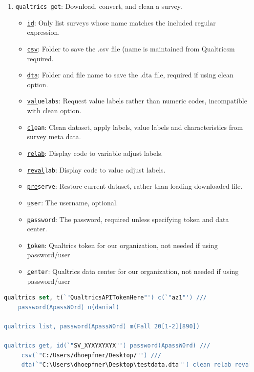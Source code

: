 {\begin{enumerate}
\begin{itemize}
\end{itemize}
\item \texttt{qualtrics get}: Download, convert, and clean a survey.
\begin{itemize}
\item \texttt{\underline{id}}: Only list surveys whose name matches the included regular expression.
\item \texttt{\underline{csv}}: Folder to save the .csv file (name is maintained from Qualtricsm required.
\item \texttt{\underline{dta}}: Folder and file name to save the .dta file, required if using clean option.
\item \texttt{\underline{val}uelabs}: Request value labels rather than numeric codes, incompatible with clean option.
\item \texttt{\underline{cl}ean}: Clean dataset, apply labels, value labels and characteristics from survey meta data.
\item \texttt{\underline{relab}}: Display code to variable adjust labels.
\item \texttt{\underline{reval}lab}: Display code to value adjust labels.
\item \texttt{\underline{pre}serve}: Restore current dataset, rather than loading downloaded file.
\item \texttt{\underline{u}ser}: The username, optional.
\item \texttt{\underline{p}assword}: The password, required unless specifying token and data center.
\item \texttt{\underline{t}oken}: Qualtrics token for our organization, not needed if using password/user
\item \texttt{\underline{c}enter}: Qualtrics data center for our organization, not needed if using password/user
\end{itemize}

\end{enumerate}

\begin{lstlisting}[language=Stata, numbers=none]
qualtrics set, t(`"QualtricsAPITokenHere"') c(`"az1"') ///
	password(ApassW0rd) u(danial)

qualtrics list, password(ApassW0rd) m(Fall 20[1-2][890])

qualtrics get, id(`"SV_XYXYXYXYX"') password(ApassW0rd) ///
     csv(`"C:/Users/dhoepfner/Desktop/"') ///
     dta(`"C:\Users\dhoepfner\Desktop\testdata.dta"') clean relab reval


\end{lstlisting}}

